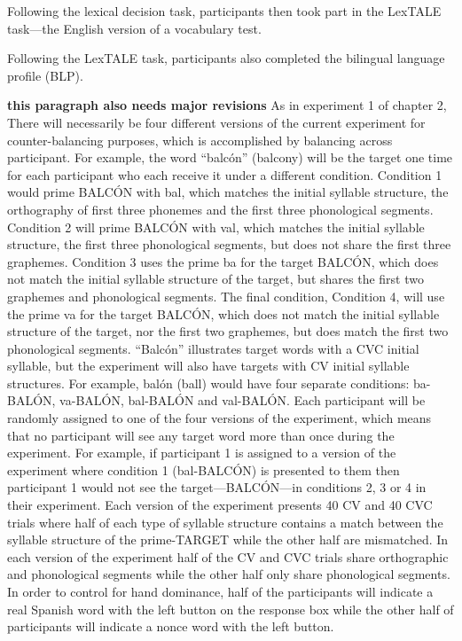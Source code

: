 Following the lexical decision task, participants then took part in the LexTALE task---the English version of a vocabulary test.

Following the LexTALE task, participants also completed the bilingual language profile (BLP).

\textbf{this paragraph also needs major revisions}
As in experiment 1 of chapter 2, There will necessarily be four different versions of the current experiment for counter-balancing purposes, which is accomplished by balancing across participant. For example, the word “balcón” (balcony) will be the target one time for each participant who each receive it under a different condition. Condition 1 would prime BALCÓN with bal, which matches the initial syllable structure, the orthography of first three phonemes and the first three phonological segments. Condition 2 will prime BALCÓN with val, which matches the initial syllable structure, the first three phonological segments, but does not share the first three graphemes. Condition 3 uses the prime ba for the target BALCÓN, which does not match the initial syllable structure of the target, but shares the first two graphemes and phonological segments. The final condition, Condition 4, will use the prime va for the target BALCÓN, which does not match the initial syllable structure of the target, nor the first two graphemes, but does match the first two phonological segments. “Balcón” illustrates target words with a CVC initial syllable, but the experiment will also have targets with CV initial syllable structures. For example, balón (ball) would have four separate conditions: ba-BALÓN, va-BALÓN, bal-BALÓN and val-BALÓN.
Each participant will be randomly assigned to one of the four versions of the experiment, which means that no participant will see any target word more than once during the experiment. For example, if participant 1 is assigned to a version of the experiment where condition 1 (bal-BALCÓN) is presented to them then participant 1 would not see the target—BALCÓN—in conditions 2, 3 or 4 in their experiment. Each version of the experiment presents 40 CV and 40 CVC trials where half of each type of syllable structure contains a match between the syllable structure of the prime-TARGET while the other half are mismatched. In each version of the experiment half of the CV and CVC trials share orthographic and phonological segments while the other half only share phonological segments. In order to control for hand dominance, half of the participants will indicate a real Spanish word with the left button on the response box while the other half of participants will indicate a nonce word with the left button.

